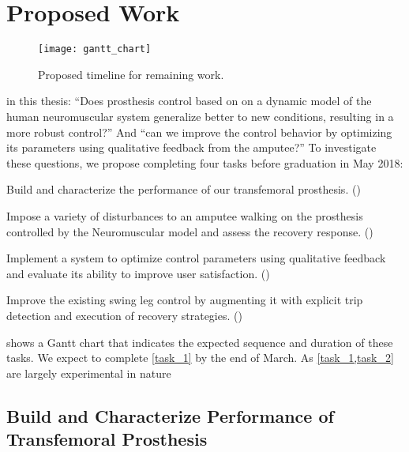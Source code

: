 \chapter{Proposed Work}
\begin{figure*}[h]
    \centering
    \texttt{[image: gantt\_chart]}
    \caption{Proposed timeline for remaining work.}\label{fig:gantt_chart}
\end{figure*}

 in this thesis: ``Does prosthesis
control based on on a dynamic model of the human neuromuscular system generalize
better to new conditions, resulting in a more robust control?'' And ``can we
improve the control behavior by optimizing its parameters using qualitative
feedback from the amputee?'' To investigate these questions, we propose
completing four tasks before graduation in May 2018: 
\begin{tasks} 
    \item\label{task_1} Build and characterize the performance of our
    transfemoral prosthesis. ()

    \item\label{task_2} Impose a variety of disturbances to an amputee walking
    on the prosthesis controlled by the Neuromuscular model and assess the
    recovery response. ()

    \item\label{task_3} Implement a system to optimize control parameters using
    qualitative feedback and evaluate its ability to improve user satisfaction.
    ()

    \item\label{task_4} Improve the existing swing leg control by augmenting it
    with explicit trip detection and execution of recovery strategies.
    ()
\end{tasks}

 shows a Gantt chart that indicates the expected sequence
and duration of these tasks. We expect to complete \cref{task_1} by the end of
March. As \cref{task_1,task_2} are largely experimental in nature 

\section{Build and Characterize Performance of Transfemoral
Prosthesis}\label{sec:proposed_build}

